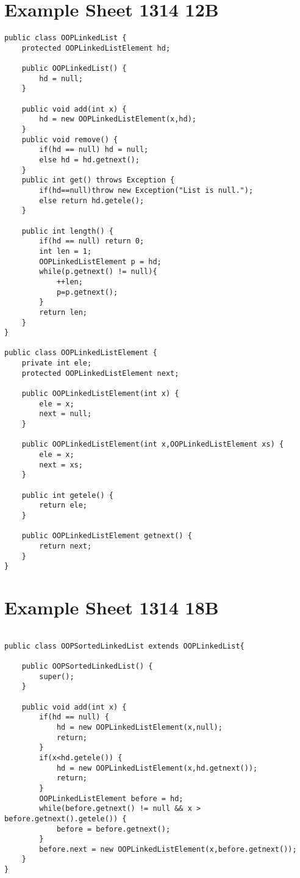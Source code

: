 \documentclass[10pt,twoside,a4paper]{article}
\begin{document}
\section{Example Sheet 1314 12B}

\begin{lstlisting}
public class OOPLinkedList {
	protected OOPLinkedListElement hd;
	
	public OOPLinkedList() {
		hd = null;
	}
	
	public void add(int x) {
		hd = new OOPLinkedListElement(x,hd);
	}
	public void remove() {
		if(hd == null) hd = null;
		else hd = hd.getnext();
	}
	public int get() throws Exception {
		if(hd==null)throw new Exception("List is null.");
		else return hd.getele();
	}
	
	public int length() {
		if(hd == null) return 0;
		int len = 1;
		OOPLinkedListElement p = hd;
		while(p.getnext() != null){
			++len;
			p=p.getnext();
		}
		return len;
	}
}

public class OOPLinkedListElement {
	private int ele;
	protected OOPLinkedListElement next;
	
	public OOPLinkedListElement(int x) {
		ele = x;
		next = null;
	}
	
	public OOPLinkedListElement(int x,OOPLinkedListElement xs) {
		ele = x;
		next = xs;
	}
	
	public int getele() {
		return ele;
	}
	
	public OOPLinkedListElement getnext() {
		return next;
	}
}
\end{lstlisting}

\section{Example Sheet 1314 18B}
\begin{lstlisting}

public class OOPSortedLinkedList extends OOPLinkedList{

	public OOPSortedLinkedList() {
		super();
	}
	
	public void add(int x) {
		if(hd == null) {
			hd = new OOPLinkedListElement(x,null);
			return;
		}
		if(x<hd.getele()) {
			hd = new OOPLinkedListElement(x,hd.getnext());
			return;
		}
		OOPLinkedListElement before = hd;
		while(before.getnext() != null && x > before.getnext().getele()) {
			before = before.getnext();
		}
		before.next = new OOPLinkedListElement(x,before.getnext());
	}
}
\end{lstlisting}
\end{document}
